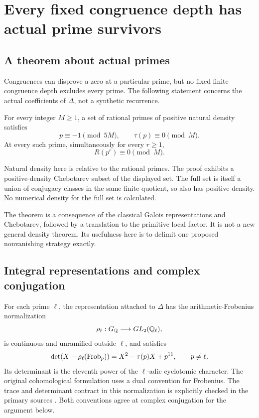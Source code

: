\chapter{Every fixed congruence depth has actual prime survivors}\label{ch:congruences}
\section{A theorem about actual primes}
Congruences can disprove a zero at a particular prime, but no fixed finite congruence depth excludes every prime. The following statement concerns the actual coefficients of $\Delta$, not a synthetic recurrence.

\begin{theorem}\label{thm:actualsurvivors}
For every integer $M\ge1$, a set of rational primes of positive natural density satisfies
\begin{equation}\label{eq:actualsurvivors}
p\equiv-1\pmod{5M},\qquad\tau(p)\equiv0\pmod M.
\end{equation}
At every such prime, simultaneously for every $r\ge1$,
\begin{equation}\label{eq:allrcongruence}
R(p^r)\equiv0\pmod M.
\end{equation}
\end{theorem}

Natural density here is relative to the rational primes. The proof exhibits a positive-density Chebotarev subset of the displayed set. The full set is itself a union of conjugacy classes in the same finite quotient, so also has positive density. No numerical density for the full set is calculated.

The theorem is a consequence of the classical Galois representations and Chebotarev, followed by a translation to the primitive local factor. It is not a new general density theorem. Its usefulness here is to delimit one proposed nonvanishing strategy exactly.

\section{Integral representations and complex conjugation}
For each prime $\ell$, the representation attached to $\Delta$ has the arithmetic-Frobenius normalization
\[
\rho_\ell:G_{\mathbb Q}\longrightarrow GL_2(\mathbb Q_\ell),
\]
is continuous and unramified outside $\ell$, and satisfies
\begin{equation}\label{eq:frobpoly}
\det(X-\rho_\ell(\operatorname{Frob}_p))=X^2-\tau(p)X+p^{11},
\qquad p\ne\ell.
\end{equation}
Its determinant is the eleventh power of the $\ell$-adic cyclotomic character. The original cohomological formulation uses a dual convention for Frobenius. The trace and determinant contract in this normalization is explicitly checked in the primary sources \cite{DeligneModular,SerreBourbaki}. Both conventions agree at complex conjugation for the argument below.

